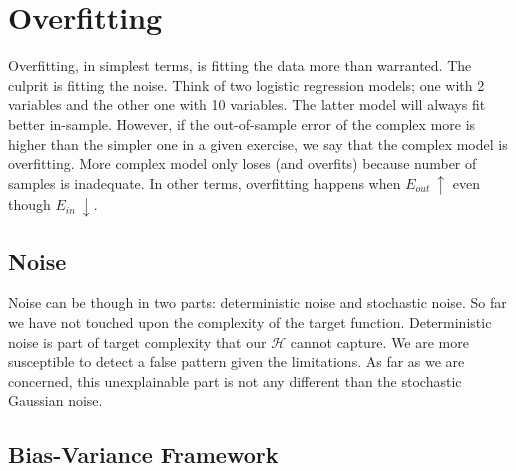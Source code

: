 \documentclass[10pt]{article}
\numberwithin{equation}{section}  %
\begin{document}


\section{Overfitting}

Overfitting, in simplest terms, is fitting the data more than warranted. The culprit is fitting the noise.
Think of two logistic regression models; one with 2 variables and the other one with 10 variables.
The latter model will always fit better in-sample. However, if the out-of-sample error of the complex more is higher than the simpler one in a given exercise, we say that the complex model is overfitting. More complex model only loses (and overfits) because number of samples is inadequate. In other terms, overfitting happens when $E_{out}\ \uparrow$ even though $E_{in}\ \downarrow$.


\subsection{Noise}

Noise can be though in two parts: deterministic noise and stochastic noise. So far we have not touched upon the complexity of the target function. Deterministic noise is part of target complexity that our $\mathcal{H}$ cannot capture. We are more susceptible to detect a false pattern given the limitations. As far as we are concerned, this unexplainable part is not any different than the stochastic Gaussian noise.

\subsection{Bias-Variance Framework}
\end{document}
